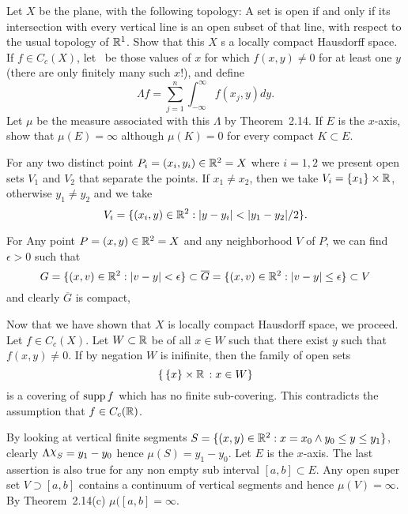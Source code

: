 \begin{enumerate}
\begin{excopy}
Let $X$ be the plane, with the following topology: A set is open
if and only if its intersection with every vertical line is an open subset
of that line,
with respect to the usual topology of \(\mathbb{R}^1\).
Show that this $X$ s a locally compact Hausdorff space.
If \(f\in C_c(X)\), let \seqxn\ be those values of $x$
for which \(f(x,y)\neq 0\) for at least one $y$
(there are only finitely many such $x$!), and define
\begin{equation*}
\Lambda f = \sum_{j=1}^n \int_{-\infty}^\infty f(x_j,y) dy.
\end{equation*}
Let \(\mu\) be the measure associated with this \(\Lambda\) by Theorem~2.14.
If $E$ is the $x$-axis, show that \(\mu(E) = \infty\) although
\(\mu(K) = 0\) for every compact \(K\subset E\).
\end{excopy}

For any two distinct point \(P_i = (x_i,y_i)\in \mathbb{R}^2 = X\) where \(i=1,2\)
we present open sets \(V_1\) and \(V_2\) that separate the points.
If \(x_1\neq x_2\), then we take  \(V_i = \{x_1\}\times\mathbb{R}\),
otherwise \(y_1\neq y_2\) and we take
\begin{equation*}
V_i = \{(x_i,y)\in\mathbb{R}^2: |y-y_i| < |y_1-y_2|/2\}.
\end{equation*}

For Any point \(P=(x,y)\in\mathbb{R}^2=X\) and any neighborhood $V$ of $P$,
we can find \(\epsilon>0\) such that
\begin{equation*}
 G = \{(x,v)\in\mathbb{R}^2: |v-y| < \epsilon\} \subset
\overline{G} = \{(x,v)\in\mathbb{R}^2: |v-y| \leq \epsilon\}  \subset V
\end{equation*}
and clearly \(\overline{G}\) is compact,

Now that we have shown that $X$ is locally compact Hausdorff space,
we proceed. Let \(f\in C_c(X)\).
Let \(W\subset \mathbb{R}\)  be of all
\(x\in W\) such that there exist $y$ such that \(f(x,y)\neq 0\).
If by negation $W$ is inifinite, then
the family of open sets
\begin{equation*}
 \{\,\{x\}\times\mathbb{R}\, : x\in W\}
\end{equation*}
is a covering of \(\mathop{\rm supp}\nolimits f\) which has no finite sub-covering.
This contradicts the assumption that \(f\in C_c(\mathbb{R})\).

By looking at vertical finite segments
\(S = \{(x,y)\in\mathbb{R}^2: x=x_0 \wedge y_0\leq y\leq y_1\}\),
clearly \(\Lambda \chhi_S = y_1 - y_0\) hence \(\mu(S) = y_1-y_0\).
Let $E$ is the $x$-axis. The last assertion is also true for any
non empty sub interval \([a,b]\subset E\).
Any open super set \(V \supset [a,b]\) contains a continuum
of vertical segments and hence \(\mu(V) = \infty\).
By Theorem~2.14(c) \(\mu([a,b] = \infty\).


\end{enumerate}
